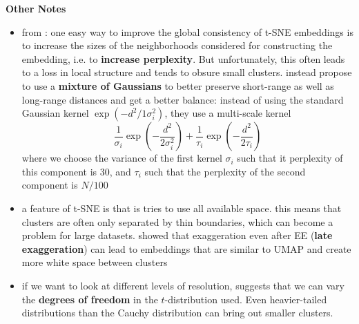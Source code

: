 \textbf{Other Notes}
\begin{itemize}
  \item from \cite{openTSNE}: one easy way to improve the global consistency of t-SNE embeddings is to increase the sizes of the neighborhoods considered for constructing the embedding, i.e. to \textbf{increase perplexity}. But unfortunately, this often leads to a loss in local structure and tends to obsure small clusters. \cite{KoBe19SingleCell} instead propose to use a \textbf{mixture of Gaussians} to better preserve short-range as well as long-range distances and get a better balance: instead of using the standard Gaussian kernel $\exp(-d^2/1\sigma_i^2)$, they use a multi-scale kernel 
  \begin{equation}
    \frac{1}{\sigma_i} \exp(-\frac{d^2}{2\sigma_i^2}) + \frac{1}{\tau_i} \exp(-\frac{d^2}{2 \tau_i})
  \end{equation}
  where we choose the variance of the first kernel $\sigma_i$ such that it perplexity of this component is 30, and $\tau_i$ such that the perplexity of the second component is $N/100$
  \item a feature of t-SNE is that is tries to use all available space. this means that clusters are often only separated by thin boundaries, which can become a problem for large datasets. \cite{BoehmBerens22} showed that exaggeration even after EE (\textbf{late exaggeration}) can lead to embeddings that are similar to UMAP and create more white space between clusters 
  \item if we want to look at different levels of resolution, \cite{Ko20HeavyTails} suggests that we can vary the \textbf{degrees of freedom} in the $t$-distribution used. Even heavier-tailed distributions than the Cauchy distribution can bring out smaller clusters. 
\end{itemize}

